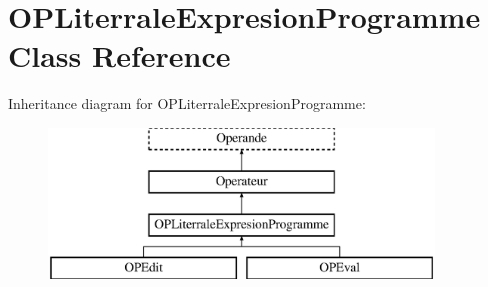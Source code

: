 \hypertarget{class_o_p_literrale_expresion_programme}{}\section{O\+P\+Literrale\+Expresion\+Programme Class Reference}
\label{class_o_p_literrale_expresion_programme}
Inheritance diagram for O\+P\+Literrale\+Expresion\+Programme\+:\begin{figure}[H]
\begin{center}
\leavevmode
\includegraphics[height=4.000000cm]{class_o_p_literrale_expresion_programme}
\end{center}
\end{figure}
